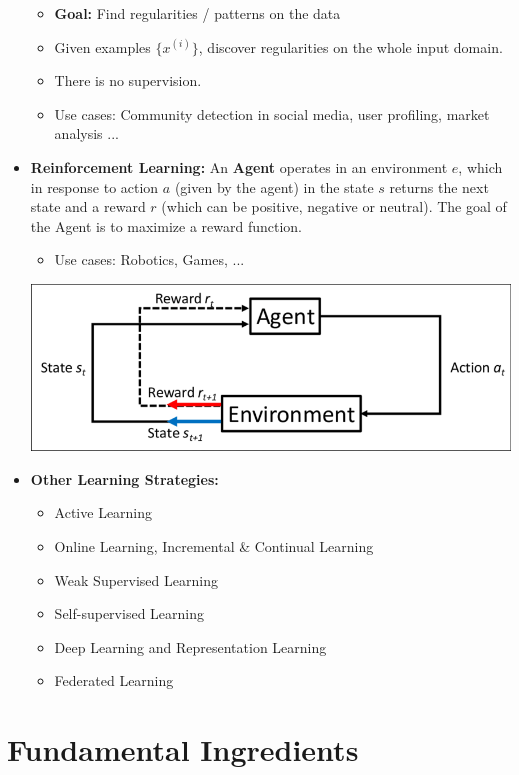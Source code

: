 \begin{itemize}
\begin{itemize}
        \item \textbf{Goal:} Find regularities / patterns on the data
        \item Given examples $\{x^{(i)}\}$, discover regularities on the whole input domain.
        \item There is no supervision.
        \item Use cases: Community detection in social media, user profiling, market analysis ...
    \end{itemize}    
    \item \textbf{Reinforcement Learning:}
    An \textbf{Agent} operates in an environment $e$, which in response to action $a$ (given by the agent) in the state $s$ returns the next state and a reward $r$ (which can be positive, negative or neutral).
    The goal of the Agent is to maximize a reward function.
    \begin{itemize}
        \item Use cases: Robotics, Games, ...
    \end{itemize}
    \begin{center}
        \includegraphics{images/Reinforcement learning.png}
    \end{center}
    \item \textbf{Other Learning Strategies:}
    \begin{itemize}
        \item Active Learning
        \item Online Learning, Incremental \& Continual Learning
        \item Weak Supervised Learning
        \item Self-supervised Learning
        \item Deep Learning and Representation Learning
        \item Federated Learning
    \end{itemize}
\end{itemize}

\section{Fundamental Ingredients}

